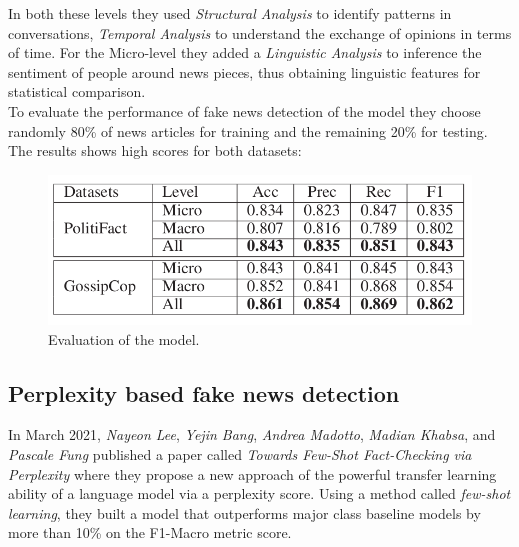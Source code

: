 \documentclass[10pt, english]{report}
\begin{document}
In both these levels they used \textit{Structural Analysis} to identify patterns in conversations, \textit{Temporal Analysis} to understand the exchange of opinions in terms of time. For the Micro-level they added a \textit{Linguistic Analysis} to inference the sentiment of people around news pieces, thus obtaining linguistic features for statistical comparison.\\

To evaluate the performance of fake news detection of the model they choose randomly 80\% of news articles for training and the remaining 20\% for testing. The results shows high scores for both datasets:

\begin{figure}[H]
	\centering
	\includegraphics[scale=0.4]{img/hierarchical_evaluation_results.png}
	\caption{Evaluation of the model. \cite{shu2020hierarchical}}
\end{figure}


\subsection{Perplexity based fake news detection \cite{lee2021towards}}
In March 2021, \textit{Nayeon Lee}, \textit{Yejin Bang}, \textit{Andrea Madotto}, \textit{Madian Khabsa}, and \textit{Pascale Fung} published a paper called \textit{Towards Few-Shot Fact-Checking via Perplexity} where they propose a new approach of the powerful transfer learning ability of a language model via a perplexity score. Using a method called \textit{few-shot learning}, they built a model that outperforms major class baseline models by more than 10\% on the F1-Macro metric score.\\
\end{document}
